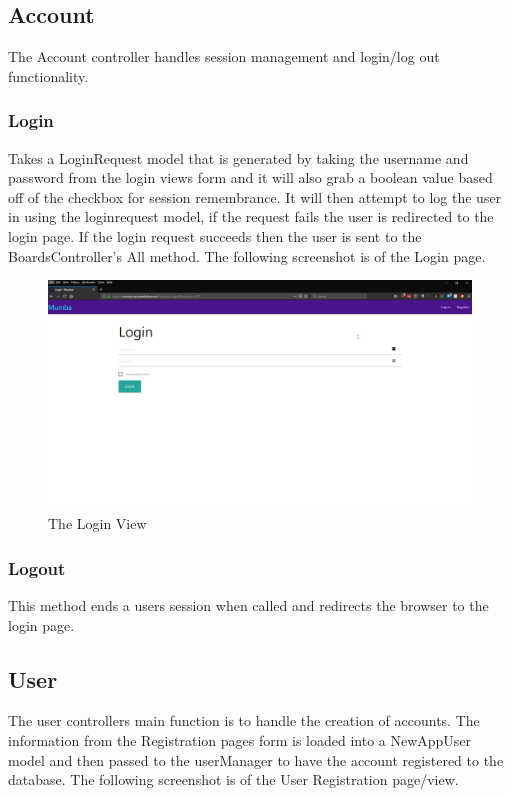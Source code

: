 \documentclass[letterpaper]{article}
\begin{document}
\subsection{Account}
The Account controller handles session management and login/log out functionality.

\subsubsection{Login}
Takes a LoginRequest model that is generated by taking the username and password from the login views form and it will also grab a boolean value based off of the checkbox for session remembrance. It will then attempt to log the user in using the loginrequest model, if the request fails the user is redirected to the login page. If the login request succeeds then the user is sent to the BoardsController's All method. The following screenshot is of the Login page.


\begin{figure}[H]
  \centering
  \caption{The Login View}
  \includegraphics[scale=0.2]{Images/Login}
\end{figure}

\subsubsection{Logout}
This method ends a users session when called and redirects the browser to the login page.

\subsection{User}

The user controllers main function is to handle the creation of accounts. The information from the Registration pages form is loaded into a NewAppUser model and then passed to the userManager to have the account registered to the database. The following screenshot is of the User Registration page/view.
\end{document}
